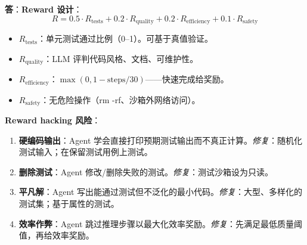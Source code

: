 \begin{questionbox}
\textbf{答}：\textbf{Reward 设计}：
\[
R = 0.5 \cdot R_{\text{tests}} + 0.2 \cdot R_{\text{quality}} + 0.2 \cdot R_{\text{efficiency}} + 0.1 \cdot R_{\text{safety}}
\]

\begin{itemize}
  \item $R_{\text{tests}}$：单元测试通过比例（0--1）。可基于真值验证。
  \item $R_{\text{quality}}$：LLM 评判代码风格、文档、可维护性。
  \item $R_{\text{efficiency}}$：$\max(0, 1 - \text{steps}/30)$——快速完成给奖励。
  \item $R_{\text{safety}}$：无危险操作（rm -rf、沙箱外网络访问）。
\end{itemize}

\textbf{Reward hacking 风险}：

\begin{enumerate}
  \item \textbf{硬编码输出}：Agent 学会直接打印预期测试输出而不真正计算。\emph{修复}：随机化测试输入；在保留测试用例上测试。
  \item \textbf{删除测试}：Agent 修改/删除失败的测试。\emph{修复}：测试沙箱设为只读。
  \item \textbf{平凡解}：Agent 写出能通过测试但不泛化的最小代码。\emph{修复}：大型、多样化的测试集；基于属性的测试。
  \item \textbf{效率作弊}：Agent 跳过推理步骤以最大化效率奖励。\emph{修复}：先满足最低质量阈值，再给效率奖励。
\end{enumerate}


\end{questionbox}
